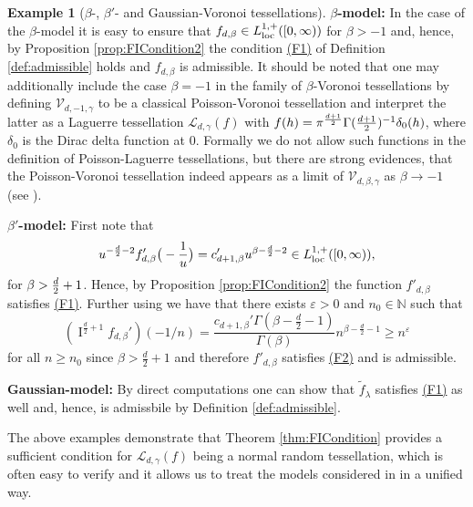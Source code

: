 \documentclass[11pt,a4paper]{article}
\theoremstyle{plain}
\theoremstyle{definition}
\newtheorem{example}[theorem]{Example}
\theoremstyle{remark}
\def\NN{\mathbb{N}}
\def\cL{\mathcal{L}}
\def\cV{\mathcal{V}}
\newcommand{\frI}{\mathop{\mathrm{I}}\nolimits}
\begin{document}
\begin{example}[$\beta$-, $\beta'$- and Gaussian-Voronoi tessellations]
\textbf{$\beta$-model:} In the case of the $\beta$-model it is easy to ensure that $f_{d,\beta} \in L_{\rm loc}^{1,+}([0,\infty))$ for $\beta>-1$ and, hence, by Proposition \ref{prop:FICondition2} the condition \hyperref[item:F1]{(F1)} of Definition \ref{def:admissible} holds and $f_{d,\beta}$ is admissible. It should be noted that one may additionally include the case $\beta=-1$ in the family of $\beta$-Voronoi tessellations by defining $\cV_{d,-1,\gamma}$ to be a classical Poisson-Voronoi tessellation and interpret the latter as a Laguerre tessellation $\cL_{d,\gamma}(f)$ with $f(h)=\pi^{d+1\over 2}\Gamma({d+1\over 2})^{-1}\delta_0(h)$, where $\delta_0$ is the Dirac delta function at $0$. Formally we do not allow such functions in the definition of Poisson-Laguerre tessellations, but there are strong evidences, that the Poisson-Voronoi tessellation indeed appears as a limit of $\cV_{d,\beta,\gamma}$ as $\beta \to -1$ (see \cite[Remark 6] {GKT20}). 

\medskip

\textbf{$\beta'$-model:} First note that
\[
    u^{-{d\over 2}-2}f'_{d,\beta}\big(-{1\over u}\big)=c'_{d+1,\beta}u^{\beta-{d\over 2}-2}\in L_{\rm loc}^{1,+}([0,\infty)),
\]
for $\beta>{d\over 2}+1$. Hence, by Proposition \ref{prop:FICondition2} the function $f'_{d,\beta}$ satisfies \hyperref[item:F1]{(F1)}. Further using \cite[Property 2.5 (b)]{TAFDE} we have that there exists $\varepsilon>0$ and $n_0\in \NN$ such that
\[
    (\frI^{\frac{d}{2}+1}f_{d,\beta}')(-1/n) = \frac{c_{d+1,\beta}'\Gamma(\beta-\frac{d}{2}-1)}{\Gamma(\beta)}n^{\beta-\frac{d}{2}-1}\ge n^\varepsilon
\]
for all $n\ge n_0$ since $\beta > \frac{d}{2}+1$ and therefore $f'_{d,\beta}$ satisfies \hyperref[item:F2]{(F2)} and is admissible. 

\medskip

\textbf{Gaussian-model:}  By direct computations one can show that $\widetilde f_{\lambda}$ satisfies \hyperref[item:F1]{(F1)} as well and, hence, is admissbile by Definition \ref{def:admissible}.
\end{example}

\medskip

The above examples demonstrate that Theorem \ref{thm:FICondition} provides a sufficient condition for $\cL_{d,\gamma}(f)$ being a normal random tessellation, which is often easy to verify and it allows us to treat the models considered in \cite{Ldoc,GKT20, GKT21} in a unified way. 
\end{document}
